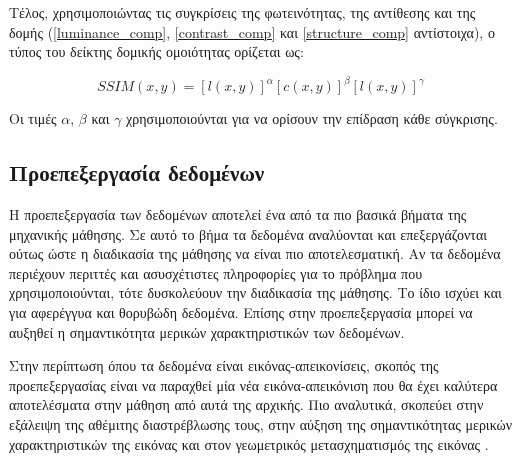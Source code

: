 \documentclass[a4paper,12pt]{article}
\begin{document}
Τέλος, χρησιμοποιώντας τις συγκρίσεις της φωτεινότητας, της αντίθεσης και της
δομής (\eqref{luminance_comp}, \eqref{contrast_comp} και \eqref{structure_comp}
αντίστοιχα), ο τύπος του δείκτης δομικής ομοιότητας ορίζεται ως:

\begin{equation*}
    SSIM(x,y) = \left[l(x,y)\right]^\alpha \left[c(x,y)\right]^\beta 
                \left[l(x,y)\right]^\gamma
\end{equation*}

Οι τιμές $\alpha$, $\beta$ και $\gamma$ χρησιμοποιούνται για να ορίσουν την
επίδραση κάθε σύγκρισης.

\subsection{Προεπεξεργασία δεδομένων} \label{preprocessing:1}

Η προεπεξεργασία των δεδομένων αποτελεί ένα από τα πιο βασικά βήματα της
μηχανικής μάθησης. Σε αυτό το βήμα τα δεδομένα αναλύονται και επεξεργάζονται
ούτως ώστε η διαδικασία της μάθησης να είναι πιο αποτελεσματική. Αν τα δεδομένα
περιέχουν περιττές και ασυσχέτιστες πληροφορίες για το πρόβλημα που
χρησιμοποιούνται, τότε δυσκολεύουν την διαδικασία της μάθησης. Το ίδιο ισχύει
και για αφερέγγυα και θορυβώδη δεδομένα. Επίσης στην προεπεξεργασία μπορεί να
αυξηθεί η σημαντικότητα μερικών χαρακτηριστικών των δεδομένων.

Στην περίπτωση όπου τα δεδομένα είναι εικόνας-απεικονίσεις, σκοπός της
προεπεξεργασίας είναι να παραχθεί μία νέα εικόνα-απεικόνιση που θα έχει καλύτερα
αποτελέσματα στην μάθηση από αυτά της αρχικής. Πιο αναλυτικά, σκοπεύει στην
εξάλειψη της αθέμιτης διαστρέβλωσης τους, στην αύξηση της σημαντικότητας μερικών
χαρακτηριστικών της εικόνας και στον γεωμετρικός μετασχηματισμός της εικόνας
\cite{Image_preprocessing:1}.

\end{document}

